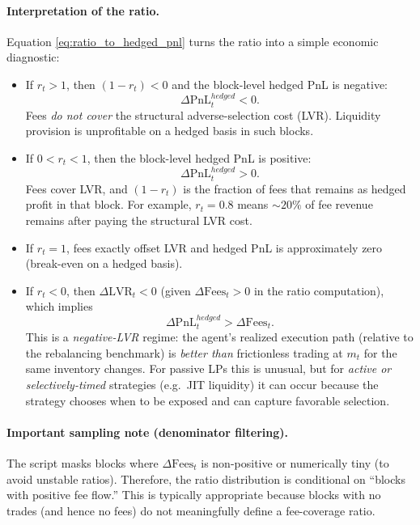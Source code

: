 \documentclass[11pt]{article}
\begin{document}
\paragraph{Interpretation of the ratio.}
Equation \eqref{eq:ratio_to_hedged_pnl} turns the ratio into a simple economic diagnostic:
\begin{itemize}
  \item If $r_t>1$, then $(1-r_t)<0$ and the block-level hedged PnL is negative:
        \[
          \Delta\mathrm{PnL}^{hedged}_t < 0.
        \]
        Fees \emph{do not cover} the structural adverse-selection cost (LVR). Liquidity provision is unprofitable
        on a hedged basis in such blocks.
  \item If $0<r_t<1$, then the block-level hedged PnL is positive:
        \[
          \Delta\mathrm{PnL}^{hedged}_t > 0.
        \]
        Fees cover LVR, and $(1-r_t)$ is the fraction of fees that remains as hedged profit in that block.
        For example, $r_t=0.8$ means $\sim 20\%$ of fee revenue remains after paying the structural LVR cost.
  \item If $r_t=1$, fees exactly offset LVR and hedged PnL is approximately zero (break-even on a hedged basis).
  \item If $r_t<0$, then $\Delta\mathrm{LVR}_t<0$ (given $\Delta\mathrm{Fees}_t>0$ in the ratio computation),
        which implies
        \[
          \Delta\mathrm{PnL}^{hedged}_t > \Delta\mathrm{Fees}_t.
        \]
        This is a \emph{negative-LVR} regime: the agent's realized execution path (relative to the rebalancing benchmark)
        is \emph{better than} frictionless trading at $m_t$ for the same inventory changes. For passive LPs this is unusual,
        but for \emph{active or selectively-timed} strategies (e.g.\ JIT liquidity) it can occur because the strategy chooses
        when to be exposed and can capture favorable selection.
\end{itemize}

\paragraph{Important sampling note (denominator filtering).}
The script masks blocks where $\Delta\mathrm{Fees}_t$ is non-positive or numerically tiny (to avoid unstable ratios).
Therefore, the ratio distribution is conditional on ``blocks with positive fee flow.'' This is typically appropriate because
blocks with no trades (and hence no fees) do not meaningfully define a fee-coverage ratio.
\end{document}
